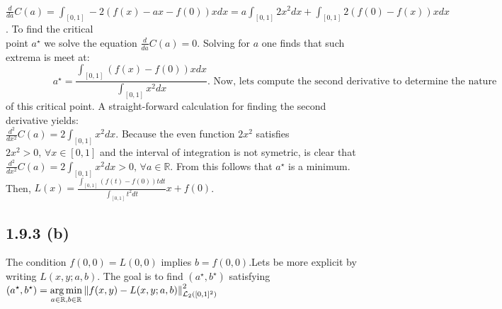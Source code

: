 \documentclass{exam}
\DeclareMathOperator*{\argmin}{arg\,min}
\begin{document}
$\frac{d}{da} C(a) = \displaystyle\int_{[0,1]} -2(f(x) - ax -f(0)) x d x = a \displaystyle \int_{[0,1]} 2x^2 d x +  \displaystyle\int_{[0,1]} 2(f(0) - f(x)) x d x$.  To find the critical \\
point $a^\star$ we solve the equation $\frac{d}{da} C(a) = 0$. Solving for $a$ one finds that such extrema is meet at: 
\begin{equation*}
    \hspace{2cm}a^\star = \displaystyle\frac{\displaystyle\int_{[0,1]} (f(x) - f(0)) x d x}{\displaystyle \int_{[0,1]} x^2 d x}. \text{ Now, lets compute the second derivative to determine the nature}
\end{equation*} of this critical point. A straight-forward calculation for finding the second derivative yields: \newline
\\
$\frac{d^2}{d x^2} C(a) = 2 \displaystyle \int_{[0,1]} x^2 d x$. Because the even function $2x^2$ satisfies $2x^2 > 0 \text{, } \forall x \in [0,1]$ and the interval of integration is not symetric, is clear that $\frac{d^2}{d x^2} C(a) = 2 \displaystyle \int_{[0,1]} x^2 d x > 0 \text{, } \forall a \in \mathbb{R}$. From this follows 
that $a^\star$ is a minimum. Then, $L(x) = \displaystyle\frac{\displaystyle\int_{[0,1]} (f(t) - f(0)) t d t}{\displaystyle \int_{[0,1]} t^2 d t}x + f(0)$.

\subsection*{1.9.3 (b)}
The condition $f(0,0) = L(0,0)$ implies $b = f(0,0)$.Lets be more explicit by writing $L(x,y;a,b)$. The goal is to find $(a^\star, b^\star)$ satisfying $\displaystyle (a^\star, b^\star) = \argmin_{ \tiny a \in \mathbb{R}, b \in \mathbb{R}} {\lVert f(x,y) - L(x,y;a,b) \rVert}^2_{\mathcal{L}_2([0,1]^2)}$
\end{document}
